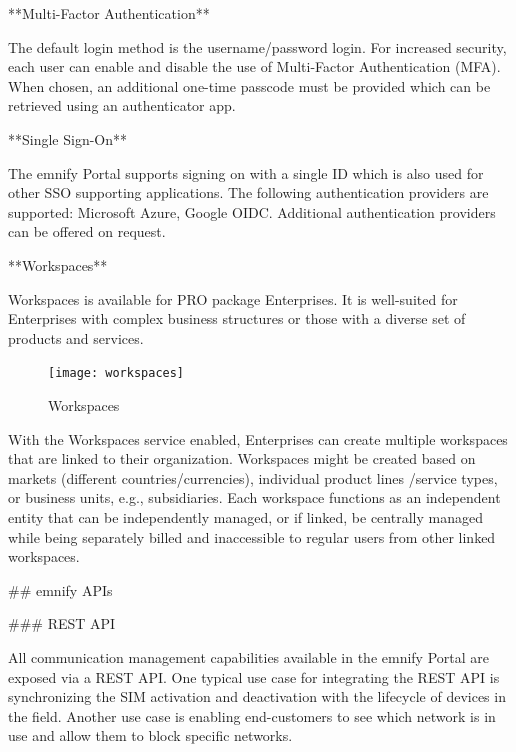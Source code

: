 \documentclass[11pt, oneside]{article}   	%
\newcommand{\addspace}{\vspace{2mm}}
\newcommand{\removespace}{\vspace{-7mm}}
\begin{document}
\addspace
\begin{markdown}

**Multi-Factor Authentication**

The default login method is the username/password login.
For increased security, each user can enable and disable the use of Multi-Factor Authentication (MFA).
When chosen, an additional one-time passcode must be provided which can be retrieved using an authenticator app. 

**Single Sign-On** 

The emnify Portal supports signing on with a single ID which is also used for other SSO supporting applications. 
The following authentication providers are supported: Microsoft Azure, Google OIDC.
Additional authentication providers can be offered on request. 
\end{markdown}
\pagebreak[4]

\begin{markdown}
**Workspaces**

Workspaces is available for PRO package Enterprises.
It is well-suited for Enterprises with complex business structures or those with a diverse set of products and services.

\end{markdown}
\addspace
\begin{figure}
  \texttt{[image: workspaces]}
  \removespace
  \caption{Workspaces}
\end{figure}
\addspace
\begin{markdown}

With the Workspaces service enabled, Enterprises can create multiple workspaces that are linked to their organization.
Workspaces might be created based on markets (different countries/currencies), individual product lines /service types, or business units, e.g., subsidiaries.
Each workspace functions as an independent entity that can be independently managed, or if linked, be centrally managed while being separately billed and inaccessible to regular users from other linked workspaces.

## emnify APIs

### REST API

All communication management capabilities available in the emnify Portal are exposed via a REST API.
One typical use case for integrating the REST API is synchronizing the SIM activation and deactivation with the lifecycle of devices in the field.
Another use case is enabling end-customers to see which network is in use and allow them to block specific networks.
\end{markdown}
\end{document}

